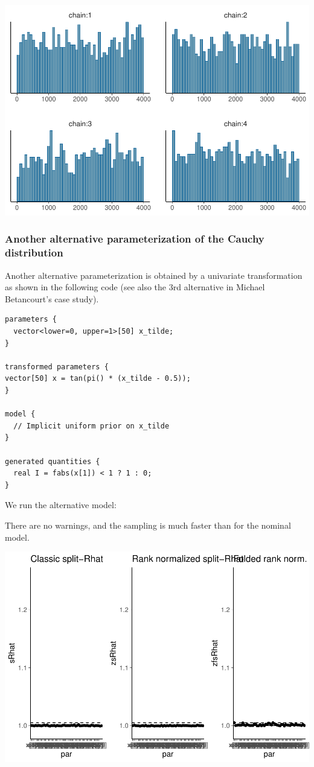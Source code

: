 \documentclass[american,]{article}
\begin{document}
\includegraphics{graphics/hist-fit-alt1-lp-1.pdf}

\hypertarget{another-alternative-parameterization-of-the-cauchy-distribution}{%
\subsubsection*{Another alternative parameterization of the Cauchy
distribution}\label{another-alternative-parameterization-of-the-cauchy-distribution}}

Another alternative parameterization is obtained by a univariate
transformation as shown in the following code (see also the 3rd
alternative in Michael Betancourt's case study).

\begin{verbatim}
parameters {
  vector<lower=0, upper=1>[50] x_tilde;
}

transformed parameters {
vector[50] x = tan(pi() * (x_tilde - 0.5));
}

model {
  // Implicit uniform prior on x_tilde
}

generated quantities {
  real I = fabs(x[1]) < 1 ? 1 : 0;
}
\end{verbatim}

We run the alternative model:

There are no warnings, and the sampling is much faster than for the
nominal model.

\includegraphics{graphics/rhat-fit-alt3-1.pdf}
\end{document}
